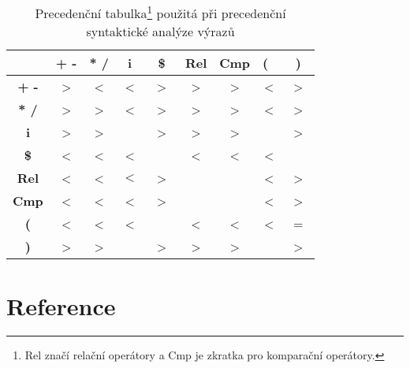 \documentclass[a4paper,12pt]{article}
\begin{document}
\begin{table}[h]
	\centering
	\begin{tabular}{|c|c|c|c|c|c|c|c|c|} 
		\hline
		                      & \textbf{+ -}   & \textbf{* /}   & \textbf{i}  & \textbf{~\$~}  & \textbf{Rel}   & \textbf{Cmp}   & \textbf{(}~ & \textbf{~)~}   \\ 
		\hline
		\textbf{\textbf{+ -}} & \textgreater{} & \textless{}    & \textless{} & \textgreater{} & \textgreater{} & \textgreater{} & \textless{} & \textgreater{} \\ 
		\hline
		\textbf{\textbf{* /}} & \textgreater{} & \textgreater{} & \textless{} & \textgreater{} & \textgreater{} & \textgreater{} & \textless{} & \textgreater{} \\ 
		\hline
		\textbf{\textbf{i}}   & \textgreater{} & \textgreater{} &             & \textgreater{} & \textgreater{} & \textgreater{} &             & \textgreater{} \\ 
		\hline
		\textbf{\textbf{\$}}  & \textless{}    & \textless{}    & \textless{} &                & \textless{}    & \textless{}    & \textless{} &                \\ 
		\hline
		\textbf{\textbf{Rel}} & \textless{}    & \textless{}    & $<$         & \textgreater{} &                &                & \textless{} & \textgreater{} \\ 
		\hline
		\textbf{\textbf{Cmp}} & \textless{}    & \textless{}    & \textless{} & \textgreater{} &                &                & \textless{} & \textgreater{} \\ 
		\hline
		\textbf{\textbf{(}}   & \textless{}    & \textless{}    & \textless{} &                & \textless{}    & \textless{}    & \textless{} & =              \\ 
		\hline
		\textbf{\textbf{)}}   & \textgreater{} & \textgreater{} &             & \textgreater{} & \textgreater{} & \textgreater{} &             & \textgreater{} \\
		\hline
	\end{tabular}
	\begin{minipage}{\textwidth}
		\vspace{1.5em}
		\caption{Precedenční tabulka\protect\footnote[6]{Rel značí relační operátory a Cmp je zkratka pro komparační operátory.} použitá při precedenční syntaktické analýze výrazů}
		\label{table:prec_table}
	\end{minipage}
\end{table}
\clearpage

\section{Reference}
\nocite{*}
\printbibliography[heading=none]
\end{document}
